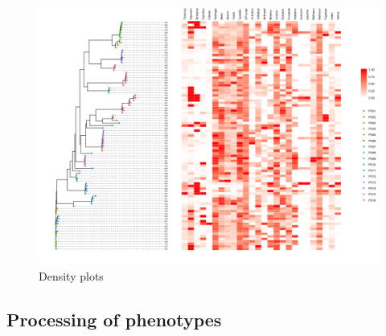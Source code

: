 \documentclass[]{article}
\begin{document}
\begin{figure}

{\centering \includegraphics[height=0.9\textheight]{_static/tree} 

}

\caption{\label{fig:dens}Density plots}\label{fig:unnamed-chunk-6}
\end{figure}

\hypertarget{processing-of-phenotypes}{%
\subsection{Processing of phenotypes}\label{processing-of-phenotypes}}
\end{document}

